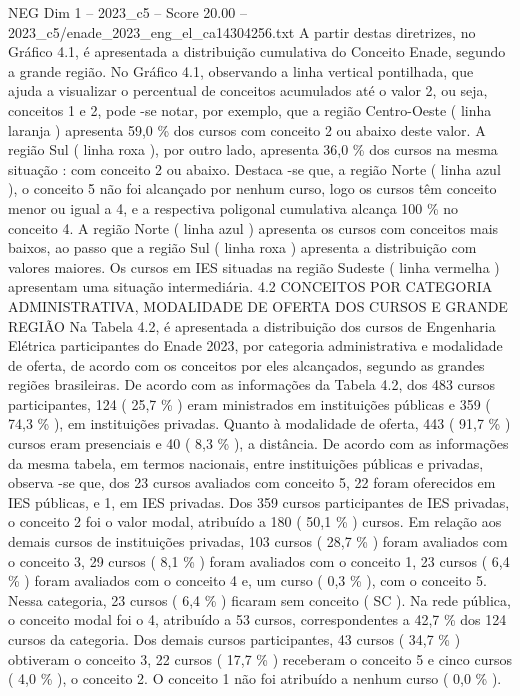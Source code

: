 \begin{textsample}{NEG Dim 1 – 2023\_c5 – Score 20.00 – 2023\_c5/enade\_2023\_eng\_el\_ca14304256.txt}
A partir destas diretrizes, no Gráfico 4.1, é apresentada a distribuição cumulativa do Conceito Enade, segundo a grande região.
No Gráfico 4.1, observando a linha vertical pontilhada, que ajuda a visualizar o percentual de conceitos acumulados até o valor 2, ou seja, conceitos 1 e 2, pode -se notar, por exemplo, que a região Centro-Oeste ( linha laranja ) apresenta 59,0 \% dos cursos com conceito 2 ou abaixo deste valor.
A região Sul ( linha roxa ), por outro lado, apresenta 36,0 \% dos cursos na mesma situação : com conceito 2 ou abaixo.
Destaca -se que, a região Norte ( linha azul ), o conceito 5 não foi alcançado por nenhum curso, logo os cursos têm conceito menor ou igual a 4, e a respectiva poligonal cumulativa alcança 100 \% no conceito 4.
A região Norte ( linha azul ) apresenta os cursos com conceitos mais baixos, ao passo que a região Sul ( linha roxa ) apresenta a distribuição com valores maiores.
Os cursos em IES situadas na região Sudeste ( linha vermelha ) apresentam uma situação intermediária. 4.2 CONCEITOS POR CATEGORIA ADMINISTRATIVA, MODALIDADE DE OFERTA DOS CURSOS E GRANDE REGIÃO Na Tabela 4.2, é apresentada a distribuição dos cursos de Engenharia Elétrica participantes do Enade 2023, por categoria administrativa e modalidade de oferta, de acordo com os conceitos por eles alcançados, segundo as grandes regiões brasileiras.
De acordo com as informações da Tabela 4.2, dos 483 cursos participantes, 124 ( 25,7 \% ) eram ministrados em instituições públicas e 359 ( 74,3 \% ), em instituições privadas.
Quanto à modalidade de oferta, 443 ( 91,7 \% ) cursos eram presenciais e 40 ( 8,3 \% ), a distância.
De acordo com as informações da mesma tabela, em termos nacionais, entre instituições públicas e privadas, observa -se que, dos 23 cursos avaliados com conceito 5, 22 foram oferecidos em IES públicas, e 1, em IES privadas.
Dos 359 cursos participantes de IES privadas, o conceito 2 foi o valor modal, atribuído a 180 ( 50,1 \% ) cursos.
Em relação aos demais cursos de instituições privadas, 103 cursos ( 28,7 \% ) foram avaliados com o conceito 3, 29 cursos ( 8,1 \% ) foram avaliados com o conceito 1, 23 cursos ( 6,4 \% ) foram avaliados com o conceito 4 e, um curso ( 0,3 \% ), com o conceito 5.
Nessa categoria, 23 cursos ( 6,4 \% ) ficaram sem conceito ( SC ).
Na rede pública, o conceito modal foi o 4, atribuído a 53 cursos, correspondentes a 42,7 \% dos 124 cursos da categoria.
Dos demais cursos participantes, 43 cursos ( 34,7 \% ) obtiveram o conceito 3, 22 cursos ( 17,7 \% ) receberam o conceito 5 e cinco cursos ( 4,0 \% ), o conceito 2.
O conceito 1 não foi atribuído a nenhum curso ( 0,0 \% ).

\end{textsample}
